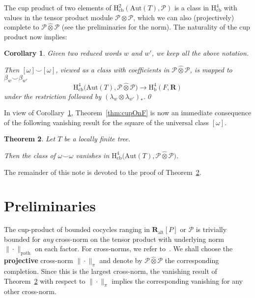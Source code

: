 \documentclass[11pt, a4paper]{amsart}
\newcommand{\RR}{\mathbf{R}}
\newcommand{\Aut}{\mathrm{Aut}}
\newcommand{\pathmod}{\RR_\mathrm{alt}[P]}
\newcommand{\pathban}{\mathscr{P}}
\newcommand{\pathnorm}[1]{\|#1\|_\mathrm{path}}
\newcommand{\hbc}{\mathrm{H}_\mathrm{cb}}
\newcommand{\hb}{\mathrm{H}_\mathrm{b}}
\newcommand{\potimes}{\mathbin{\widehat\otimes}}
\newcommand{\cp}{\mathbin{\smallsmile}}
\theoremstyle{plain}
\newtheorem{thm}{Theorem}
\newtheorem{cor}[thm]{Corollary}
\begin{document}
The cup product of two elements of $\hbc^2(\Aut(T), \pathban)$ is a class in $\hbc^4$ with values in the tensor product module $\pathban\otimes\pathban$, which we can also (projectively) complete to $\pathban\potimes\pathban$ (see the preliminaries for the norm). The naturality of the cup product now implies:

\begin{cor}\label{cor:mother}
Given two reduced words $w$ and $w'$, we keep all the above notation.

Then $[\omega]\cp[\omega]$, viewed as a class with coefficients in $\pathban\potimes\pathban$, is mapped to $\beta_w\cp\beta_{w'}$
%
$$\hbc^4\big(\Aut(T), \pathban\potimes\pathban\big) \longrightarrow \hb^4(F, \RR)$$
%
under the restriction followed by $(\lambda_w\otimes\lambda_{w'})_*$.\qed
\end{cor}

In view of Corollary~\ref{cor:mother}, Theorem~\ref{thm:cupOnF} is now an immediate consequence of the following vanishing result for the square of the universal class $[\omega]$.

\begin{thm}\label{mainthm}
Let $T$ be a locally finite tree.

Then the class of $\omega\cp \omega$ vanishes in $\hbc^4\big(\Aut(T), \pathban\potimes\pathban\big)$.
\end{thm}

\noindent
The remainder of this note is devoted to the proof of Theorem~\ref{mainthm}.

\section{Preliminaries}%
The cup-product of bounded cocycles ranging in $\pathmod$ or $\pathban$ is trivially bounded for \emph{any} cross-norm on the tensor product with underlying norm $\pathnorm\cdot$ on each factor. For cross-norms, we refer to~\cite{Ryan_book}. We shall choose the \textbf{projective} cross-norm $\|\cdot\|_\pi$ and denote by $\pathban\potimes\pathban$ the corresponding completion. Since this is the largest cross-norm, the vanishing result of Theorem~\ref{mainthm} with respect to $\|\cdot\|_\pi$ implies the corresponding vanishing for any other cross-norm.

\medskip
\end{document}
